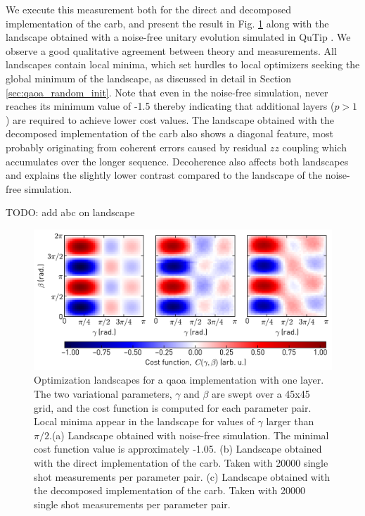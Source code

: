 We execute this measurement both for the direct and decomposed implementation of the \gls{carb}, and present the result in Fig. \ref{fig:qaoa_landscapes} along with the landscape obtained with a noise-free unitary evolution simulated in QuTip \cite{Johansson2013QuTiPSystems}. We observe a good qualitative agreement between theory and measurements. All landscapes contain local minima, which set hurdles to local optimizers seeking the global minimum of the landscape, as discussed in detail in Section \ref{sec:qaoa_random_init}. Note that even in the noise-free simulation, \cost{} never reaches its minimum value of -1.5 thereby indicating that additional layers ($p >1$) are required to achieve lower cost values. 
The landscape obtained with the decomposed implementation of the \gls{carb} also shows a diagonal feature, most probably originating from coherent errors caused by residual $zz$ coupling which accumulates over the longer sequence. Decoherence also affects both landscapes and explains the slightly lower contrast compared to the landscape of the noise-free simulation.

TODO: add abc on landscape
\begin{figure}[ht]
    \centering
    \includegraphics[width=\textwidth]{chapters/qaoa/figs/qaoa_landscapes_20200129_125251.png}
    \caption{Optimization landscapes for a \gls{qaoa} implementation with one layer. The two variational parameters, $\gamma$ and $\beta$ are swept over a 45x45 grid, and the cost function is computed for each parameter pair. Local minima appear in the landscape for values of $\gamma$ larger than $\pi/2$.(a) Landscape obtained with noise-free simulation. The minimal cost function value is approximately -1.05. (b) Landscape obtained with the direct implementation of the \gls{carb}. Taken with 20000 single shot measurements per parameter pair. (c) Landscape obtained with the decomposed implementation of the \gls{carb}. Taken with 20000 single shot measurements per parameter pair. }
    \label{fig:qaoa_landscapes}
\end{figure}

